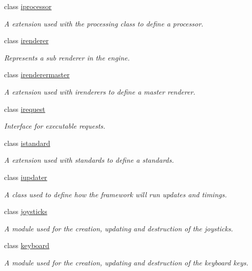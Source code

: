 \begin{DoxyCompactItemize}
class \hyperlink{classflounder_1_1iprocessor}{iprocessor}
\begin{DoxyCompactList}\small\item\em A extension used with the processing class to define a processor. \end{DoxyCompactList}\item 
class \hyperlink{classflounder_1_1irenderer}{irenderer}
\begin{DoxyCompactList}\small\item\em Represents a sub renderer in the engine. \end{DoxyCompactList}\item 
class \hyperlink{classflounder_1_1irenderermaster}{irenderermaster}
\begin{DoxyCompactList}\small\item\em A extension used with irenderers to define a master renderer. \end{DoxyCompactList}\item 
class \hyperlink{classflounder_1_1irequest}{irequest}
\begin{DoxyCompactList}\small\item\em Interface for executable requests. \end{DoxyCompactList}\item 
class \hyperlink{classflounder_1_1istandard}{istandard}
\begin{DoxyCompactList}\small\item\em A extension used with standards to define a standards. \end{DoxyCompactList}\item 
class \hyperlink{classflounder_1_1iupdater}{iupdater}
\begin{DoxyCompactList}\small\item\em A class used to define how the framework will run updates and timings. \end{DoxyCompactList}\item 
class \hyperlink{classflounder_1_1joysticks}{joysticks}
\begin{DoxyCompactList}\small\item\em A module used for the creation, updating and destruction of the joysticks. \end{DoxyCompactList}\item 
class \hyperlink{classflounder_1_1keyboard}{keyboard}
\begin{DoxyCompactList}\small\item\em A module used for the creation, updating and destruction of the keyboard keys. \end{DoxyCompactList}\item 

\end{DoxyCompactItemize}
